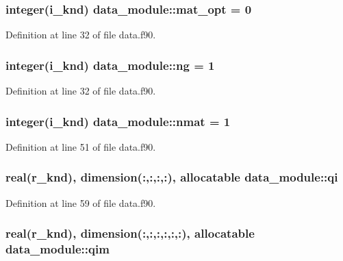 \hypertarget{classdata__module_a191b122ec7d6da5c691c45d89d65694f}{
\subsubsection[{mat\-\_\-opt}]{\setlength{\rightskip}{0pt plus 5cm}integer(i\-\_\-knd) data\-\_\-module\-::mat\-\_\-opt = 0}}\label{classdata__module_a191b122ec7d6da5c691c45d89d65694f}


Definition at line 32 of file data.\-f90.

\hypertarget{classdata__module_a6ea7c9f76a6293c4f8b39b1782564561}{
\subsubsection[{ng}]{\setlength{\rightskip}{0pt plus 5cm}integer(i\-\_\-knd) data\-\_\-module\-::ng = 1}}\label{classdata__module_a6ea7c9f76a6293c4f8b39b1782564561}


Definition at line 32 of file data.\-f90.

\hypertarget{classdata__module_ad6de7dfbc5089cdc8cdfe59d6232f7d2}{
\subsubsection[{nmat}]{\setlength{\rightskip}{0pt plus 5cm}integer(i\-\_\-knd) data\-\_\-module\-::nmat = 1}}\label{classdata__module_ad6de7dfbc5089cdc8cdfe59d6232f7d2}


Definition at line 51 of file data.\-f90.

\hypertarget{classdata__module_a6d90b19307bcaef3132e6854534ba68f}{
\subsubsection[{qi}]{\setlength{\rightskip}{0pt plus 5cm}real(r\-\_\-knd), dimension(\-:,\-:,\-:,\-:), allocatable data\-\_\-module\-::qi}}\label{classdata__module_a6d90b19307bcaef3132e6854534ba68f}


Definition at line 59 of file data.\-f90.

\hypertarget{classdata__module_ab410d844881c0109e63b2e26e3dbbd37}{
\subsubsection[{qim}]{\setlength{\rightskip}{0pt plus 5cm}real(r\-\_\-knd), dimension(\-:,\-:,\-:,\-:,\-:,\-:), allocatable data\-\_\-module\-::qim}}\label{classdata__module_ab410d844881c0109e63b2e26e3dbbd37}


